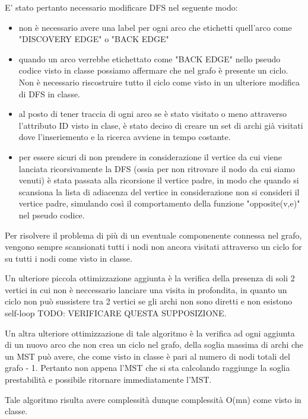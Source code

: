 E' stato pertanto necessario modificare DFS nel seguente modo:
\begin{itemize}
	\item non è necessario avere una label per ogni arco che etichetti quell'arco come "DISCOVERY EDGE" o "BACK EDGE"
	\item quando un arco verrebbe etichettato come "BACK EDGE" nello pseudo codice visto in classe possiamo affermare che nel grafo è presente un ciclo. Non è necessario riscostruire tutto il ciclo come visto in un ulteriore modifica di DFS in classe.
	\item al posto di tener traccia di ogni arco se è stato visitato o meno attraverso l'attributo ID visto in clase, è stato deciso di creare un set di archi già visitati dove l'inseriemento e la ricerca avviene in tempo costante.
	\item per essere sicuri di non prendere in considerazione il vertice da cui viene lanciata ricorsivamente la DFS (ossia per non ritrovare il nodo da cui siamo venuti) è stata passata alla ricorsione il vertice padre, in modo che quando si scansiona la lista di adiacenza del vertice in considerazione non si consideri il vertice padre, simulando così il comportamento della funzione "opposite(v,e)" nel pseudo codice.
\end{itemize}

Per risolvere il problema di più di un eventuale componenente connessa nel grafo, vengono sempre scansionati tutti i nodi non ancora visitati attraverso un ciclo for su tutti i nodi come visto in classe.

Un ulteriore piccola ottimizzazione aggiunta è la verifica della presenza di soli 2 vertici in cui non è neccessario lanciare una visita in profondita, in quanto un ciclo non può sussistere tra 2 vertici se gli archi non sono diretti e non esistono self-loop TODO: VERIFICARE QUESTA SUPPOSIZIONE.

Un altra ulteriore ottimizzazione di tale algoritmo è la verifica ad ogni aggiunta di un nuovo arco che non crea un ciclo nel grafo, della soglia massima di archi che un MST può avere, che come visto in classe è pari al numero di nodi totali del grafo - 1. Pertanto non appena l'MST che si sta calcolando raggiunge la soglia prestabilità e possibile ritornare immediatamente l'MST.

Tale algoritmo risulta avere complessità dunque complessità O(mn) come visto in classe.


